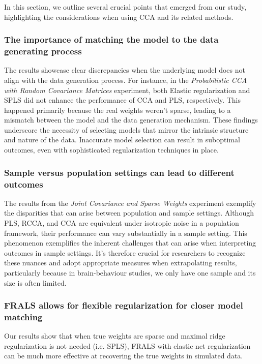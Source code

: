 In this section, we outline several crucial points that emerged from our study, highlighting the considerations when using CCA and its related methods.

\subsubsection{The importance of matching the model to the data generating process}

The results showcase clear discrepancies when the underlying model does not align with the data generation process. For instance, in the \textit{Probabilistic CCA with Random Covariance Matrices} experiment, both Elastic regularization and SPLS did not enhance the performance of CCA and PLS, respectively.
This happened primarily because the real weights weren't sparse, leading to a mismatch between the model and the data generation mechanism.
These findings underscore the necessity of selecting models that mirror the intrinsic structure and nature of the data.
Inaccurate model selection can result in suboptimal outcomes, even with sophisticated regularization techniques in place.

\subsubsection{Sample versus population settings can lead to different outcomes}

The results from the \textit{Joint Covariance and Sparse Weights} experiment exemplify the disparities that can arise between population and sample settings.
Although PLS, RCCA, and CCA are equivalent under isotropic noise in a population framework, their performance can vary substantially in a sample setting.
This phenomenon exemplifies the inherent challenges that can arise when interpreting outcomes in sample settings.
It's therefore crucial for researchers to recognize these nuances and adopt appropriate measures when extrapolating results, particularly because in brain-behaviour studies, we only have one sample and its size is often limited.

\subsubsection{FRALS allows for flexible regularization for closer model matching}

Our results show that when true weights are sparse and maximal ridge regularization is not needed (i.e. SPLS), FRALS with elastic net regularization can be much more effective at recovering the true weights in simulated data.

